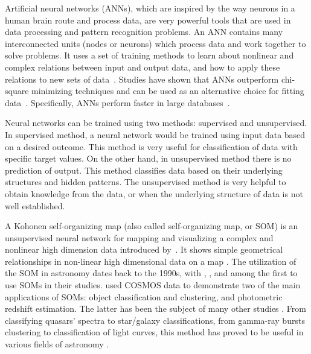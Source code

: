 Artificial neural networks (ANNs), which are inspired by the way neurons in a human brain route and process data, are very powerful tools that are used in data processing and pattern recognition problems.
An ANN contains many interconnected units (nodes or neurons) which process data and work together to solve problems.
It uses a set of training methods to learn about nonlinear and complex relations between input and output data, and how to apply these relations to new sets of data~\citep[e.g.][]{Hossein14,Hossein16,Ellison16a, Ellison16b}.
Studies have shown that ANNs outperform chi-square minimizing techniques and can be used as an alternative choice for fitting data~\citep[e.g.][]{Marquez91}.
Specifically, ANNs perform faster in large databases~\citep[][]{Gulati97}.

Neural networks can be trained using two methods: supervised and unsupervised.
In supervised method, a neural network would be trained using input data based on a desired outcome.
This method is very useful for classification of data with specific target values.
On the other hand, in unsupervised method there is no prediction of output.
This method classifies data based on their underlying structures and hidden patterns.
The unsupervised method is very helpful to obtain knowledge from the data, or when the underlying structure of data is not well established.

A Kohonen self-organizing map (also called self-organizing map, or SOM) is an unsupervised neural network for mapping and visualizing a complex and nonlinear high dimension data introduced by~\citet{Kohonen82}.
It shows simple geometrical relationships in non-linear high dimensional data on a map \citep{Kohonen98}.
The utilization of the SOM in astronomy dates back to the 1990s, with \citet[][]{Odewahn92}, \citet[][]{Hernandez94}, and \citet[][]{Murtagh95} among the first to use SOMs in their studies.
\citet{Geach12} used COSMOS data to demonstrate two of the main applications of SOMs: object classification and clustering, and photometric redshift estimation. The latter has been the subject of many other studies \citep[e.g.][]{Kind14a}.
From classifying quasars' spectra to star/galaxy classifications, from gamma-ray bursts clustering to classification of light curves, this method has proved to be useful in various fields of astronomy \citep[e.g.][]{Maehoenen95, Miller96, Andreon00, Balastegui01, Rajaniemi02, Brett04, Scaringi09}.


